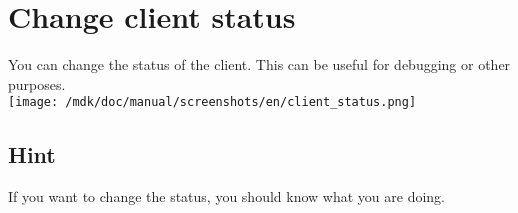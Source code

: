 \section{Change client status}You can change the status of the client. This can be useful for debugging or other purposes.\\
\texttt{[image: /mdk/doc/manual/screenshots/en/client\_status.png]} \\
\subsection{Hint}
If you want to change the status, you should know what you are doing.\\
